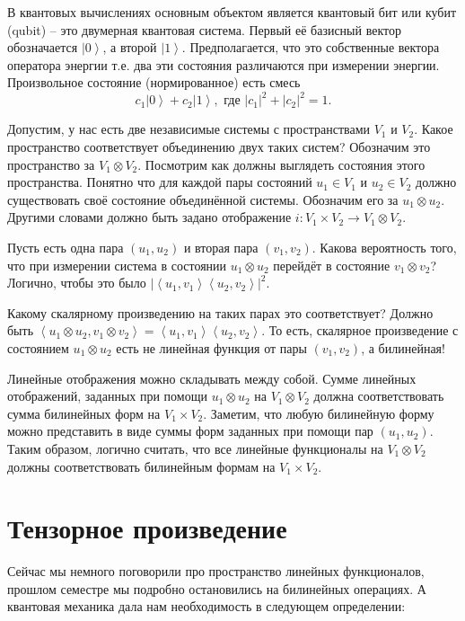 \documentclass[12pt,a4paper,oneside]{book}
\theoremstyle{definition}
\def\lan{\left\langle }
\def\ran{\right\rangle}
\begin{document}
В квантовых вычислениях основным объектом является квантовый бит или кубит (qubit) -- это двумерная квантовая система. Первый её базисный вектор обозначается $\left|0\ran$, а второй $ \left|1\ran$. Предполагается, что это собственные вектора оператора энергии т.е. два эти состояния различаются при измерении энергии. Произвольное состояние (нормированное) есть смесь 
$$c_1 \left|0\ran+ c_2 \left| 1\ran, \text{ где } |c_1|^2+|c_2|^2=1.$$
 

Допустим, у нас есть две независимые системы с пространствами $V_1$ и $V_2$. Какое пространство соответствует  объединению двух таких систем? Обозначим это пространство за $V_1\otimes V_2$. Посмотрим как должны выглядеть состояния этого пространства. Понятно что для каждой пары состояний $u_1\in V_1$ и $u_2\in V_2$ должно существовать своё состояние объединённой системы. Обозначим его за $u_1 \otimes u_2$. Другими словами должно быть задано отображение $i\colon V_1\times V_2\to V_1 \otimes V_2$.

Пусть есть одна пара $(u_1,u_2)$ и вторая пара $(v_1,v_2)$. Какова вероятность того, что при измерении система в состоянии $u_1\otimes u_2$ перейдёт  в состояние $v_1 \otimes v_2$? Логично, чтобы это было $|\lan u_1,v_1 \ran \lan u_2, v_2\ran|^2$.

Какому скалярному произведению на таких парах это соответствует? Должно быть $\lan u_1\otimes u_2, v_1\otimes v_2\ran = \lan u_1,v_1 \ran \lan u_2, v_2\ran$. То есть, скалярное произведение с состоянием $u_1\otimes u_2$ есть не линейная функция от пары $(v_1, v_2)$, а билинейная!



Линейные отображения можно складывать между собой. Сумме линейных отображений, заданных при помощи $u_1\otimes u_2$ на $V_1\otimes V_2$ должна соответствовать сумма билинейных форм на $V_1\times V_2$. Заметим, что любую билинейную форму можно представить в виде суммы форм заданных при помощи пар $(u_1,u_2)$. Таким образом, логично считать, что все линейные функционалы на $V_1\otimes V_2$ должны соответствовать билинейным формам на $V_1\times V_2$.





\section{Тензорное произведение}

Сейчас мы немного поговорили про пространство линейных функционалов, прошлом семестре мы подробно остановились на билинейных операциях. А квантовая механика дала нам необходимость в следующем определении:
\end{document}
